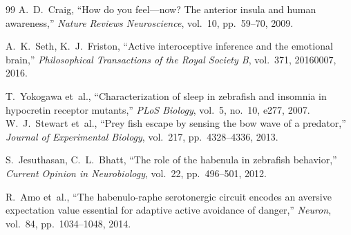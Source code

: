 \documentclass[11pt,a4paper]{article}
\begin{document}
\begin{thebibliography}{99}
  A.~D.~Craig,
  ``How do you feel---now? The anterior insula and human awareness,''
  \textit{Nature Reviews Neuroscience}, vol.~10, pp.~59--70, 2009.

  A.~K.~Seth, K.~J.~Friston,
  ``Active interoceptive inference and the emotional brain,''
  \textit{Philosophical Transactions of the Royal Society B}, vol.~371, 20160007, 2016.

  T.~Yokogawa et~al.,
  ``Characterization of sleep in zebrafish and insomnia in hypocretin receptor mutants,''
  \textit{PLoS Biology}, vol.~5, no.~10, e277, 2007.
  W.~J.~Stewart et~al.,
  ``Prey fish escape by sensing the bow wave of a predator,''
  \textit{Journal of Experimental Biology}, vol.~217, pp.~4328--4336, 2013.

  S.~Jesuthasan, C.~L.~Bhatt,
  ``The role of the habenula in zebrafish behavior,''
  \textit{Current Opinion in Neurobiology}, vol.~22, pp.~496--501, 2012.

  R.~Amo et~al.,
  ``The habenulo-raphe serotonergic circuit encodes an aversive expectation value essential for adaptive active avoidance of danger,''
  \textit{Neuron}, vol.~84, pp.~1034--1048, 2014.

\end{thebibliography}
\end{document}
